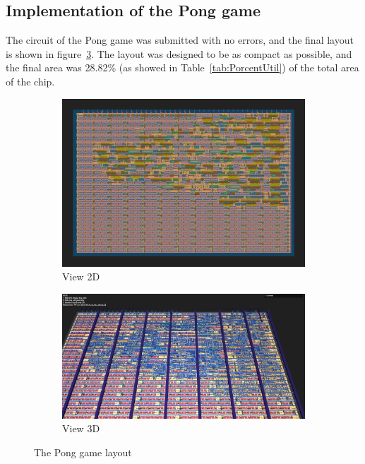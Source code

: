 \subsection{Implementation of the Pong game}

The circuit of the Pong game was submitted with no errors, and the final layout is shown in figure\ \ref{fig:Pong_Layout}. The layout was designed to be as compact as possible, and the final area was 28.82\% (as showed in Table\ \ref*{tab:PorcentUtil}) of the total area of the chip.

\begin{figure}[H]
    \centering
    \begin{subfigure}[b]{0.45\textwidth}
        \includegraphics[width=\linewidth]{Pictures/Result_Pong_2D_View.png}
        \caption{View 2D}\label{fig:pong_2D}
    \end{subfigure}
    \begin{subfigure}[b]{0.45\textwidth}
        \includegraphics[width=\linewidth]{Pictures/Result_Pong_3D_View.png}
        \caption{View 3D}\label{fig:pong_3D}
    \end{subfigure}
    \caption{The Pong game layout}\label{fig:Pong_Layout}
\end{figure}

